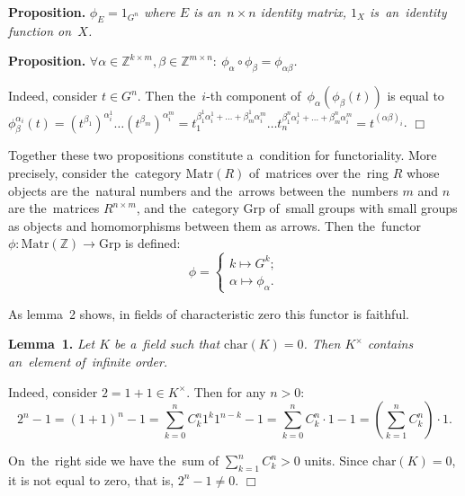 \documentclass[twoside]{article}
\begin{document}
\medskip\noindent\textbf{Proposition.}\emph{
    $\phi_{E} = 1_{G^n}$ where $E$ is an~$n \times n$ identity matrix, $1_X$ is~an~identity function on~$X$.
}

\medskip\noindent\textbf{Proposition.}\emph{
    $
        \forall \alpha \in \mathbb{Z}^{k \times m}, \beta \in \mathbb{Z}^{m \times n}{:}\ \phi_\alpha \circ \phi_\beta = \phi_{\alpha \beta}
    $.
}\medskip

    Indeed, consider $t \in G^n$. Then the~$i$-th component of~$\phi_\alpha(\phi_\beta(t))$
    is equal to $\phi_\beta^{\alpha_i}(t) = (t^{\beta_1})^{\alpha_i^1} \ldots (t^{\beta_m})^{\alpha_i^m}
                                          = t_1^{\beta_1^1 \alpha_i^1 + \ldots + \beta_m^1 \alpha_i^m}
                                            \ldots
                                            t_n^{\beta_1^n \alpha_i^1 + \ldots + \beta_m^n \alpha_i^m}
                                          = t^{(\alpha \beta)_i}$.
\hfill$\Box$\medskip

Together these two propositions constitute a~condition for functoriality. More precisely, consider the~category $\mathrm{Matr}(R)$ of~matrices over the~ring $R$
whose objects are the~natural numbers and the~arrows between the~numbers $m$ and $n$ are the~matrices $R^{n \times m}$,
and the~category $\mathrm{Grp}$ of~small groups with small groups as objects and homomorphisms between them as arrows.
Then the~functor $\phi : \mathrm{Matr}(\mathbb{Z}) \rightarrow \mathrm{Grp}$ is defined:
$$
    \phi = \begin{cases}
        k \mapsto G^k; \\
        \alpha \mapsto \phi_\alpha.
    \end{cases}
$$

As lemma~2 shows, in fields of characteristic zero this functor is faithful.

\medskip\noindent\textbf{Lemma~1.}\emph{
    Let $K$ be a~field such that $\mathrm{char}(K) = 0$.
    Then $K^\times$ contains an~element of~infinite order.
}\medskip

    Indeed, consider $2 = 1 + 1 \in K^\times$. Then for any $n > 0$:
    $$
        2^n - 1 = (1 + 1)^n - 1 = \sum_{k = 0}^n C^n_k 1^k 1^{n - k} - 1
                                = \sum_{k = 0}^n C^n_k \cdot 1 - 1
                                = \left(\sum_{k = 1}^n C^n_k \right) \cdot 1.
    $$

    On~the~right side we have the~sum of $\sum_{k = 1}^n C^n_k > 0$ units. Since $\mathrm{char}(K) = 0$,
    it is not equal to zero, that is, $2^n - 1 \neq 0$.
\hfill$\Box$\medskip
\end{document}
